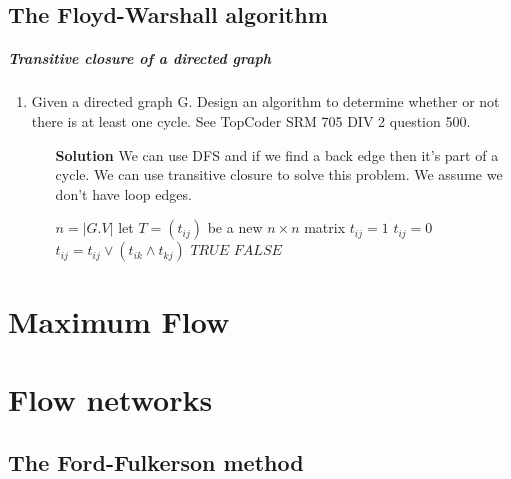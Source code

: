 \documentclass{book}
\begin{document}
	\section{The Floyd-Warshall algorithm}
	\paragraph{Transitive closure of a directed graph}
	\begin{enumerate}
		\item Given a directed graph G. Design an algorithm to determine whether or not there is at least one cycle. See TopCoder SRM 705 DIV 2 question 500.
		\begin{itemize}
			\item[\textbf{Solution}] We can use DFS and if we find a back edge then it's part of a cycle. We can use transitive closure to solve this problem. We assume we don't have loop edges.
			\begin{algorithm*}[h!]
				\begin{algorithmic}
						\State $n = |G.V|$
						\State let $T = (t_{ij})$ be a new $n \times n$ matrix
									\State $t_{ij} = 1$
								\Else
									\State $t_{ij} = 0$								
								\EndIf
							\EndFor
						\EndFor
									\State $t_{ij} = t_{ij} \lor (t_{ik} \land t_{kj})$
								\EndFor
							\EndFor
						\EndFor
								\State \Return $TRUE$
							\EndIf
						\EndFor
						\State \Return $FALSE$
					\EndFunction
				\end{algorithmic}
			\end{algorithm*}
		\end{itemize}
	\end{enumerate}
	\chapter{Maximum Flow}
	\chapter{Flow networks}
	\section{The Ford-Fulkerson method}
\end{document}
